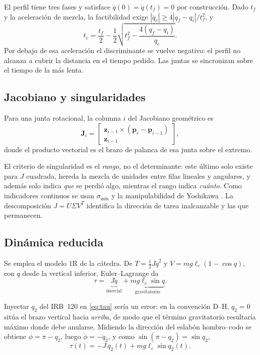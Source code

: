 \documentclass[conference]{IEEEtran}
\begin{document}
El perfil tiene tres fases y satisface $\dot q(0)=\dot q(t_f)=0$ por
construcción. Dado $t_f$ y la aceleración de mezcla, la factibilidad
exige $|\ddot q_c| \ge 4|q_f-q_i|/t_f^2$, y
\begin{equation}
    t_c = \frac{t_f}{2}-\frac12\sqrt{t_f^2-\frac{4(q_f-q_i)}{\ddot q_c}} .
    \label{eq:tc}
\end{equation}
Por debajo de esa aceleración el discriminante se vuelve negativo: el
perfil no alcanza a cubrir la distancia en el tiempo pedido. Las juntas
se sincronizan sobre el tiempo de la más lenta.

\subsection{Jacobiano y singularidades}

Para una junta rotacional, la columna $i$ del Jacobiano geométrico es
\begin{equation}
    \bm{J}_i = \begin{bmatrix}
      \bm{z}_{i-1}\times(\bm{p}_e-\bm{p}_{i-1})\\ \bm{z}_{i-1}
    \end{bmatrix},
    \label{eq:jac}
\end{equation}
donde el producto vectorial es el brazo de palanca de esa junta sobre
el extremo.

El criterio de singularidad es el \emph{rango}, no el determinante:
este último solo existe para $J$ cuadrada, hereda la mezcla de unidades
entre filas lineales y angulares, y además solo indica \emph{que} se
perdió algo, mientras el rango indica \emph{cuánto}. Como indicadores
continuos se usan $\sigma_{\min}$ y la manipulabilidad de Yoshikawa
\cite{b4}. La descomposición $J=U\Sigma V^{T}$ identifica la dirección
de tarea inalcanzable y las que permanecen.

\subsection{Dinámica reducida}

Se emplea el modelo 1R de la cátedra. De $T=\tfrac12 J\dot q^2$ y
$V=mg\ell_c(1-\cos q)$, con $q$ desde la vertical inferior,
Euler--Lagrange da
\begin{equation}
    \tau = \underbrace{J\ddot q}_{\text{inercial}}
         + \underbrace{mg\ell_c\sin q}_{\text{gravitatorio}} .
    \label{eq:tau}
\end{equation}

Inyectar $q_2$ del IRB~120 en \eqref{eq:tau} sería un error: en la
convención D--H, $q_2=0$ sitúa el brazo vertical hacia \emph{arriba},
de modo que el término gravitatorio resultaría máximo donde debe
anularse. Midiendo la dirección del eslabón hombro--codo se obtiene
$\phi=\pi-q_2$, luego $\ddot\phi=-\ddot q_2$, y como
$\sin(\pi-q_2)=\sin q_2$,
\begin{equation}
    \tau(t) = -J\,\ddot q_2(t) + mg\ell_c\sin q_2(t).
\end{equation}
\end{document}
